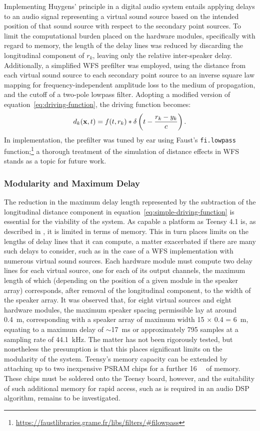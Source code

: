 Implementing Huygens' principle in a digital audio system entails applying
delays to an audio signal representing a virtual sound source based on the
intended position of that sound source with respect to the secondary point
sources.
To limit the computational burden placed on the hardware modules, specifically
with regard to memory, the length of the delay lines was reduced by discarding
the longitudinal component of $r_k$, leaving only the relative inter-speaker
delay.
Additionally, a simplified WFS prefilter was employed, using the distance
from each virtual sound source to each secondary point source to an inverse
square law mapping for frequency-independent amplitude loss to the medium of
propagation, and the cutoff of a two-pole lowpass filter.
Adopting a modified version of equation~\eqref{eq:driving-function}, the
driving function becomes:
\begin{equation}
    \label{eq:simple-driving-function}
    d_k(\mathbf{x},t) = f(t, r_k) \ast \delta\left(t - \frac{r_k-y_k}{c}\right).
\end{equation}
In implementation, the prefilter was tuned by ear using Faust's
\texttt{fi.lowpass} function;\footnote{
    \url{https://faustlibraries.grame.fr/libs/filters/\#filowpass}
}
a thorough treatment of the simulation of distance effects in WFS stands as a
topic for future work.

\subsubsection{Modularity and Maximum Delay}

The reduction in the maximum delay length represented by the subtraction of
the longitudinal distance component in
equation~\eqref{eq:simple-driving-function} is essential for the viability of
the system.
As capable a platform as Teensy 4.1 is, as described in
, it is limited in terms of memory.
This in turn places limits on the lengths of delay lines that it can compute,
a matter exacerbated if there are many such delays to consider, such as in the
case of a WFS implementation with numerous virtual sound sources.
Each hardware module must compute two delay lines for each virtual source, one
for each of its output channels, the maximum length of which (depending on
the position of a given module in the speaker array) corresponds, after removal
of the longitudinal component, to the width of the speaker array.
It was observed that, for eight virtual sources and eight hardware modules,
the maximum speaker spacing permissible lay at around \qty{.4}{\m},
corresponding with a speaker array of maximum width 15 $\times$ 0.4 =
\qty{6}{\m}, equating to a maximum delay of $\sim$\qty{17}{\ms} or
approximately 795 samples at a sampling rate of \qty{44.1}{\kHz}.
The matter has not been rigorously tested, but nonetheless the presumption is
that this places significant limits on the modularity of the system.
Teensy's memory capacity can be extended by attaching up to two inexpensive
PSRAM chips for a further \qty{16}{\mega\byte} of memory.
These chips must be soldered onto the Teensy board, however, and the suitability
of such additional memory for rapid access, such as is required in an audio DSP
algorithm, remains to be investigated.

